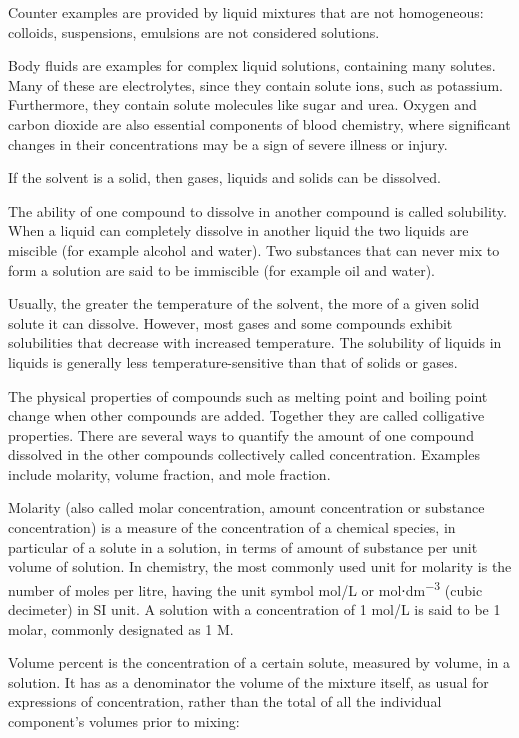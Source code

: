 Counter examples are provided by liquid mixtures that are not homogeneous: colloids, suspensions, emulsions are not considered solutions.

Body fluids are examples for complex liquid solutions, containing many solutes. Many of these are electrolytes, since they contain solute ions, such as potassium. Furthermore, they contain solute molecules like sugar and urea. Oxygen and carbon dioxide are also essential components of blood chemistry, where significant changes in their concentrations may be a sign of severe illness or injury.

If the solvent is a solid, then gases, liquids and solids can be dissolved.

The ability of one compound to dissolve in another compound is called solubility. When a liquid can completely dissolve in another liquid the two liquids are miscible (for example alcohol and water). Two substances that can never mix to form a solution are said to be immiscible (for example oil and water).

Usually, the greater the temperature of the solvent, the more of a given solid solute it can dissolve. However, most gases and some compounds exhibit solubilities that decrease with increased temperature. The solubility of liquids in liquids is generally less temperature-sensitive than that of solids or gases.

The physical properties of compounds such as melting point and boiling point change when other compounds are added. Together they are called colligative properties. There are several ways to quantify the amount of one compound dissolved in the other compounds collectively called concentration. Examples include molarity, volume fraction, and mole fraction.

Molarity (also called molar concentration, amount concentration or substance concentration) is a measure of the concentration of a chemical species, in particular of a solute in a solution, in terms of amount of substance per unit volume of solution. In chemistry, the most commonly used unit for molarity is the number of moles per litre, having the unit symbol mol/L or mol⋅dm\textsuperscript{−3} (cubic decimeter) in SI unit. A solution with a concentration of 1 mol/L is said to be 1 molar, commonly designated as 1 M.

Volume percent is the concentration of a certain solute, measured by volume, in a solution. It has as a denominator the volume of the mixture itself, as usual for expressions of concentration, rather than the total of all the individual component's volumes prior to mixing:

